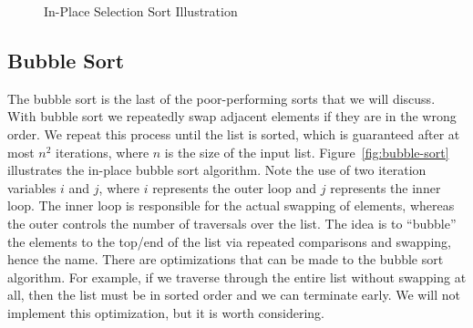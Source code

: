 \begin{figure}[tp]
\caption{In-Place Selection Sort Illustration}
\end{figure}

\subsection*{Bubble Sort}
The bubble sort is the last of the poor-performing sorts that we will discuss. With bubble sort we repeatedly swap adjacent elements if they are in the wrong order. We repeat this process until the list is sorted, which is guaranteed after at most $n^2$ iterations, where $n$ is the size of the input list. Figure~\ref{fig:bubble-sort} illustrates the in-place bubble sort algorithm. Note the use of two iteration variables $i$ and $j$, where $i$ represents the outer loop and $j$ represents the inner loop. The inner loop is responsible for the actual swapping of elements, whereas the outer controls the number of traversals over the list. The idea is to ``bubble'' the elements to the top/end of the list via repeated comparisons and swapping, hence the name. There are optimizations that can be made to the bubble sort algorithm. For example, if we traverse through the entire list without swapping at all, then the list must be in sorted order and we can terminate early. We will not implement this optimization, but it is worth considering.

